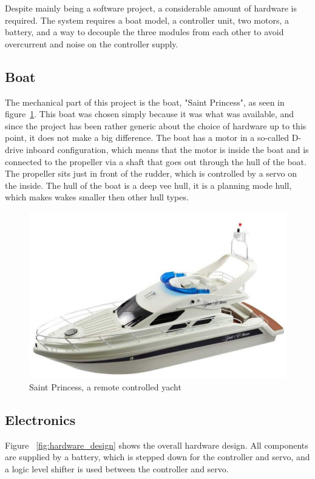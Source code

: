 Despite mainly being a software project, a considerable amount of hardware is required. The system requires a boat model, a controller unit, two motors, a battery, and a way to decouple the three modules from each other to avoid overcurrent and noise on the controller supply. 


\subsection{Boat}
The mechanical part of this project is the boat, "Saint Princess", as seen in figure~\ref{fig:saintprincess}. This boat was chosen simply because it was what was available, and since the project has been rather generic about the choice of hardware up to this point, it does not make a big difference. The boat has a motor in a so-called D-drive inboard configuration\cite{motor_config}, which means that the motor is inside the boat and is connected to the propeller via a shaft that goes out through the hull of the boat. The propeller sits just in front of the rudder, which is controlled by a servo on the inside. The hull of the boat is a deep vee hull\cite{hull-types}, it is a planning mode hull, which makes wakes smaller then other hull types.

\begin{figure}[H]
\centering
\includegraphics[width=0.5\linewidth]{saint_princess}
\caption{Saint Princess, a remote controlled yacht\cite{saint_princess}}
\label{fig:saintprincess}
\end{figure}

\subsection{Electronics}

Figure ~\ref{fig:hardware_design} shows the overall hardware design. All components are supplied by a battery, which is stepped down for the controller and servo, and a logic level shifter is used between the controller and servo. 


